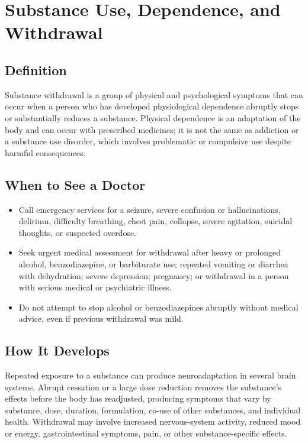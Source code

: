 \chapter{Substance Use, Dependence, and Withdrawal}

\section*{Definition}
Substance withdrawal is a group of physical and psychological symptoms that can occur when a person who has developed physiological dependence abruptly stops or substantially reduces a substance. Physical dependence is an adaptation of the body and can occur with prescribed medicines; it is not the same as addiction or a substance use disorder, which involves problematic or compulsive use despite harmful consequences.

\section*{When to See a Doctor}

\begin{itemize}
 \item Call emergency services for a seizure, severe confusion or hallucinations, delirium, difficulty breathing, chest pain, collapse, severe agitation, suicidal thoughts, or suspected overdose.
 \item Seek urgent medical assessment for withdrawal after heavy or prolonged alcohol, benzodiazepine, or barbiturate use; repeated vomiting or diarrhea with dehydration; severe depression; pregnancy; or withdrawal in a person with serious medical or psychiatric illness.
 \item Do not attempt to stop alcohol or benzodiazepines abruptly without medical advice, even if previous withdrawal was mild.
\end{itemize}

\section*{How It Develops}
Repeated exposure to a substance can produce neuroadaptation in several brain systems. Abrupt cessation or a large dose reduction removes the substance's effects before the body has readjusted, producing symptoms that vary by substance, dose, duration, formulation, co-use of other substances, and individual health. Withdrawal may involve increased nervous-system activity, reduced mood or energy, gastrointestinal symptoms, pain, or other substance-specific effects.

